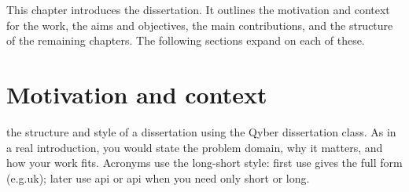 %

This chapter introduces the dissertation. It outlines the motivation and context for the work, the aims and objectives, the main contributions, and the structure of the remaining chapters. The following sections expand on each of these.


\section{Motivation and context}\label{sec:motivation}

 the structure and style of a dissertation using the Qyber dissertation class. As in a real introduction, you would state the problem domain, why it matters, and how your work fits. Acronyms use the long-short style: first use gives the full form (e.g.\@ \gls{uk}); later use \acrshort{api} or \acrlong{api} when you need only short or long.


